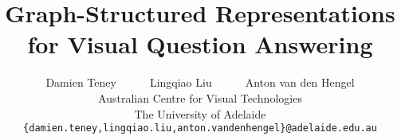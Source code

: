 \documentclass[10pt,twocolumn,letterpaper]{article}
\begin{document}
\title{Graph-Structured Representations for Visual Question Answering}

\author{Damien Teney~~~~~~Lingqiao Liu~~~~~~Anton van den Hengel\\
Australian Centre for Visual Technologies\\
The University of Adelaide\\
{\tt\small \{damien.teney,lingqiao.liu,anton.vandenhengel\}@adelaide.edu.au}
}

\maketitle


\newpage

{\small}
\clearpage


\end{document}
